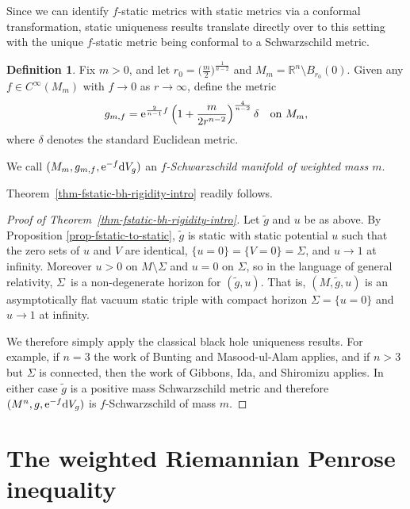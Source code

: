 \documentclass[pdftex]{sigma}
\numberwithin{equation}{section}
\theoremstyle{definition}
\newtheorem{Definition}[Theorem]{Definition}
\begin{document}
Since we can identify $f$-static metrics with static metrics via a conformal transformation, static uniqueness results translate directly over to this setting with the unique $f$-static metric being conformal to a Schwarzschild metric.


\begin{Definition}\label{def-f-schwarzschild}
	Fix $m>0$, and let $r_0=\big(\frac{m}{2}\big)^{\frac{1}{n-2}}$ and
	$M_m=\mathbb{R}^n\setminus B_{r_0}(0)$.
	Given any $f\in C^\infty(M_m)$ with $f\to 0$ as $r\to\infty$, define the metric
	\[
	g_{m,f}
	={\rm e}^{\frac{2}{n-1}f}\left(1+\frac{m}{2 r^{ n-2}}\right)^{\frac{4}{n-2}}\delta
	\quad\text{on }M_m,
	\]
	where $\delta$ denotes the standard Euclidean metric.
	
	We call $(M_m,g_{m,f},{\rm e}^{-f}{\rm d}V_g)$ an \emph{$f$-Schwarzschild manifold of weighted mass $m$}.
\end{Definition}

Theorem~\ref{thm-fstatic-bh-rigidity-intro} readily follows.

\begin{proof}[Proof of Theorem~\ref{thm-fstatic-bh-rigidity-intro}]
	Let $\widetilde g$ and $u$ be as above. By Proposition \ref{prop-fstatic-to-static}, $\widetilde g$ is static with static potential $u$ such that the zero sets of $u$ and $V$ are identical, $\{u=0\}=\{V=0\}=\Sigma$, and $u\to 1$ at infinity. Moreover $u>0$ on $M\setminus\Sigma$ and $u=0$ on $\Sigma$, so in the language of general relativity, $\Sigma$~is a non-degenerate horizon for $(\widetilde g,u)$. That is, $(M,\widetilde g,u)$ is an asymptotically flat vacuum static triple with compact horizon $\Sigma=\{u=0\}$ and
	$u\to 1$ at infinity.
	
	We therefore simply apply the classical black hole uniqueness results. For example, if $n=3$ the work of Bunting and Masood-ul-Alam \cite{BuntingMasoodUlAlam87} applies, and if $n>3$ but $\Sigma$ is connected, then the work of Gibbons, Ida, and Shiromizu \cite{GibbonsIdaShiromizu02} applies. In either case $\widetilde g$ is a positive mass Schwarzschild metric and therefore $(M^n,g,{\rm e}^{-f}{\rm d}V_g)$ is
	$f$-Schwarzschild of mass $m$.
\end{proof}



\section{The weighted Riemannian Penrose inequality}
\end{document}
